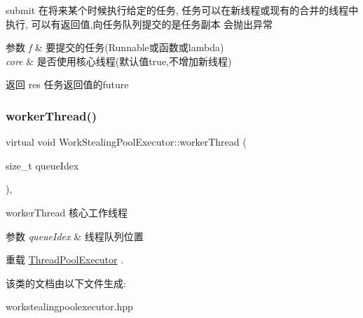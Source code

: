 submit 在将来某个时候执行给定的任务, 任务可以在新线程或现有的合并的线程中执行, 可以有返回值,向任务队列提交的是任务副本 会抛出异常 


\begin{DoxyParams}{参数}
{\em f} & 要提交的任务(Runnable或函数或lambda) \\
\hline
{\em core} & 是否使用核心线程(默认值true,不增加新线程)\\
\hline
\end{DoxyParams}
\begin{DoxyReturn}{返回}
res 任务返回值的future 
\end{DoxyReturn}
\mbox{\label{classWorkStealingPoolExecutor_ad00399d153ba5d77704dae2c1816b566}} 
\subsubsection{\texorpdfstring{worker\+Thread()}{workerThread()}}
{\footnotesize\ttfamily virtual void Work\+Stealing\+Pool\+Executor\+::worker\+Thread (\begin{DoxyParamCaption}\item[{size\+\_\+t}]{queue\+Idex }\end{DoxyParamCaption})\hspace{0.3cm}{\ttfamily [override]}, {\ttfamily [virtual]}}



worker\+Thread 核心工作线程 


\begin{DoxyParams}{参数}
{\em queue\+Idex} & 线程队列位置 \\
\hline
\end{DoxyParams}


重载 \hyperlink{classThreadPoolExecutor_a844902ce61fb16b11a569b8ee56e80e9}{Thread\+Pool\+Executor} .



该类的文档由以下文件生成\+:\begin{DoxyCompactItemize}
\item 
workstealingpoolexecutor.\+hpp\end{DoxyCompactItemize}
